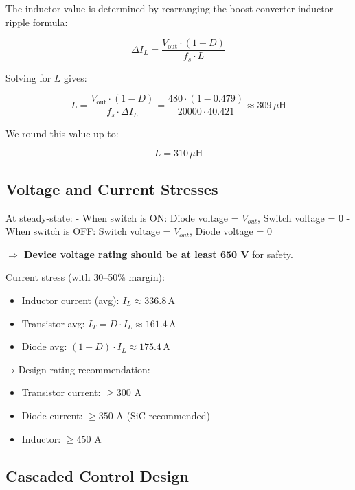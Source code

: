 The inductor value is determined by rearranging the boost converter inductor ripple formula:

\begin{equation}
    \Delta I_L = \frac{V_{\text{out}} \cdot (1 - D)}{f_s \cdot L}
\end{equation}

Solving for $L$ gives:

\begin{equation}
    L = \frac{V_{\text{out}} \cdot (1 - D)}{f_s \cdot \Delta I_L} = \frac{480 \cdot (1 - 0.479)}{20000 \cdot 40.421} \approx 309\,\mu\text{H}
\end{equation}

We round this value up to:

\begin{equation}
    L = 310\,\mu\text{H}
\end{equation}
\subsection{Voltage and Current Stresses}

At steady-state:
- When switch is ON: Diode voltage = $V_{out}$, Switch voltage = 0
- When switch is OFF: Switch voltage = $V_{out}$, Diode voltage = 0

\textbf{$\Rightarrow$ Device voltage rating should be at least 650 V} for safety.

Current stress (with 30–50\% margin):

\begin{itemize}
    \item Inductor current (avg): $I_L \approx 336.8\,\mathrm{A}$
    \item Transistor avg: $I_T = D \cdot I_L \approx 161.4\,\mathrm{A}$
    \item Diode avg: $(1-D)\cdot I_L \approx 175.4\,\mathrm{A}$
\end{itemize}

→ Design rating recommendation:
\begin{itemize}
    \item Transistor current: $\geq 300$ A
    \item Diode current: $\geq 350$ A (SiC recommended)
    \item Inductor: $\geq 450$ A
\end{itemize}

\subsection{Cascaded Control Design}


